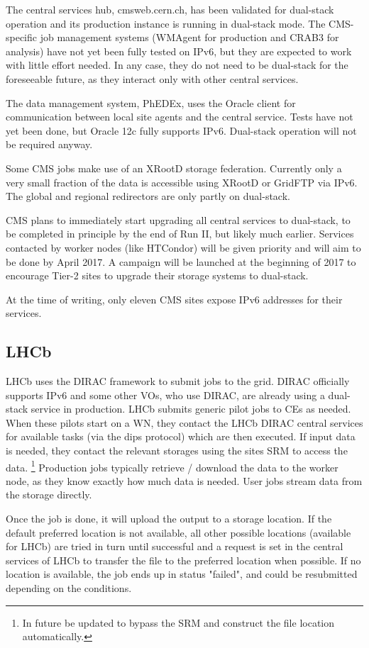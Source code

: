 \documentclass[a4paper]{jpconf}
\begin{document}
The central services hub, cmsweb.cern.ch, has been validated for
dual-stack operation and its production instance is running in
dual-stack mode. The CMS-specific job management systems (WMAgent for
production and CRAB3 for analysis) have not yet been fully tested on
IPv6, but they are expected to work with little effort needed. In any
case, they do not need to be dual-stack for the foreseeable future,
as they interact only with other central services.

The data management system, PhEDEx, uses the Oracle client for
communication between local site agents and the central service. Tests
have not yet been done, but Oracle 12c fully supports IPv6. Dual-stack
operation will not be required anyway.

Some CMS jobs make use of an XRootD storage federation.  Currently only a very small fraction
of the data is accessible using XRootD or GridFTP via IPv6. The global
and regional redirectors are only partly on dual-stack.

CMS plans to immediately start upgrading all central services to
dual-stack, to be completed in principle by the end of Run II, but
likely much earlier. Services contacted by worker nodes (like
HTCondor) will be given priority and will aim to be done by April
2017. A campaign will be launched at the beginning of 2017 to
encourage Tier-2 sites to upgrade their storage systems to dual-stack.

At the time of writing, only eleven CMS sites expose IPv6 addresses
for their services.

\subsection{LHCb}
LHCb uses the DIRAC framework to submit jobs to the grid. DIRAC
officially supports IPv6 and some other VOs, who use DIRAC, are
already using a dual-stack service in production.  LHCb submits
generic pilot jobs to CEs as needed. When these pilots start on a WN,
they contact the LHCb DIRAC central services for available tasks (via
the dips protocol) which are then executed. If input data is needed,
they contact the relevant storages using the sites SRM to access
the data. \footnote{In future be updated to bypass the SRM and construct the file 
location automatically.} Production jobs typically retrieve / download the data to
the worker node, as they know exactly how much data is needed. User
jobs stream data from the storage directly.

Once the job is done, it will upload the output to a storage
location. If the default preferred location is not available, all
other possible locations (available for LHCb) are tried in turn until
successful and a request is set in the central services of LHCb to
transfer the file to the preferred location when possible. If no
location is available, the job ends up in status "failed", and could
be resubmitted depending on the conditions.
\end{document}
